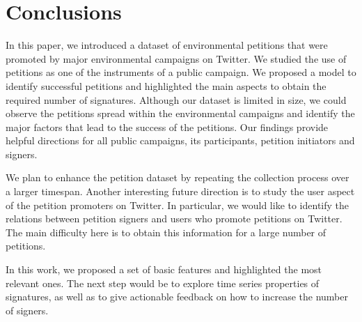 \section{Conclusions}
In this paper, we introduced a dataset of environmental petitions that were promoted by major environmental campaigns on Twitter.
We studied the use of petitions as one of the instruments of a public campaign.
We proposed a model to identify successful petitions and highlighted the main aspects to obtain the required number of signatures.
Although our dataset is limited in size, we could observe the petitions spread within the environmental campaigns and identify the major factors that lead to the success of the petitions.
Our findings provide helpful directions for all public campaigns, its participants, petition initiators and signers.

We plan to enhance the petition dataset by repeating the collection process over a larger timespan.
Another interesting future direction is to study the user aspect of the petition promoters on Twitter. In particular, we would like to identify the relations between petition signers and users who promote petitions on Twitter. The main difficulty here is to obtain this information for a large number of petitions.

In this work, we proposed a set of basic features and highlighted the most relevant ones. The next step would be to explore time series properties of signatures, as well as to give actionable feedback on how to increase the number of signers.